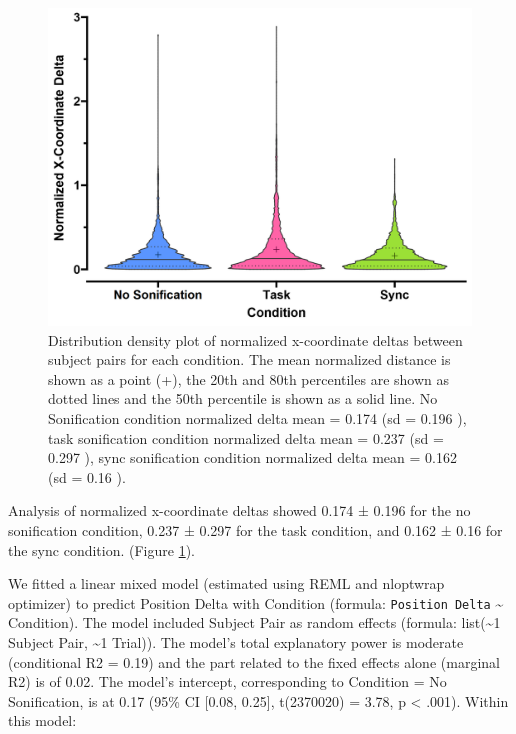 \documentclass[10pt,a4paper,onecolumn]{article}
\begin{document}
\begin{figure}[h]

{\centering \includegraphics[width=1\linewidth]{figures/parwise_position_delta} 

}

\caption{Distribution density plot of normalized x-coordinate deltas between subject pairs for each condition. The mean normalized distance is shown as a point (+), the 20th and 80th percentiles are shown as dotted lines and the 50th percentile is shown as a solid line. No Sonification condition normalized delta mean  =  0.174 (sd =  0.196 ), task sonification condition normalized delta mean =  0.237 (sd =  0.297 ), sync sonification condition normalized delta mean =  0.162 (sd =  0.16 ).}\label{fig:pairwise-position-delta}
\end{figure}

Analysis of normalized x-coordinate deltas showed 0.174 ± 0.196 for the no sonification condition,
0.237 ± 0.297 for the task condition, and
0.162 ± 0.16 for the sync condition. (Figure \ref{fig:pairwise-position-delta}).

We fitted a linear mixed model (estimated using REML and nloptwrap optimizer) to predict Position Delta with Condition (formula: \texttt{Position\ Delta} \textasciitilde{} Condition). The model included Subject Pair as random effects (formula: list(\textasciitilde1 \textbar{} Subject Pair, \textasciitilde1 \textbar{} Trial)). The model's total explanatory power is moderate (conditional R2 = 0.19) and the part related to the fixed effects alone (marginal R2) is of 0.02. The model's intercept, corresponding to Condition = No Sonification, is at 0.17 (95\% CI {[}0.08, 0.25{]}, t(2370020) = 3.78, p \textless{} .001). Within this model:
\end{document}
